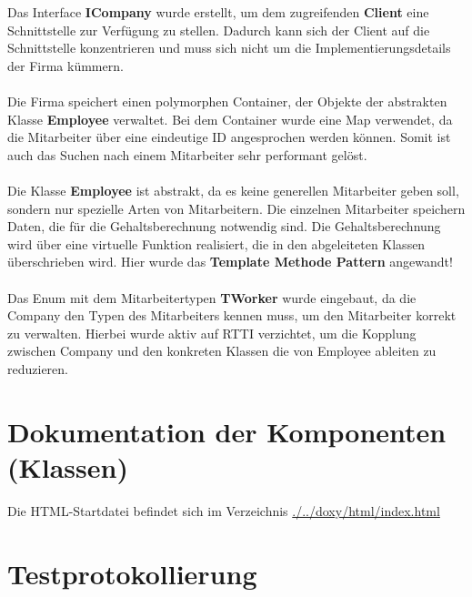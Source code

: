 \documentclass[12pt,naustrian,a4widepaper]{scrartcl}
\begin{document}
Das Interface \textbf{ICompany} wurde erstellt, um dem zugreifenden \textbf{Client} eine Schnittstelle zur Verfügung zu stellen.
Dadurch kann sich der Client auf die Schnittstelle konzentrieren und muss sich nicht um die Implementierungsdetails der Firma kümmern.
\\
\\
Die Firma speichert einen polymorphen Container, der Objekte der abstrakten Klasse \textbf{Employee} verwaltet.
Bei dem Container wurde eine Map verwendet, da die Mitarbeiter über eine eindeutige ID angesprochen werden können.
Somit ist auch das Suchen nach einem Mitarbeiter sehr performant gelöst.
\\
\\
Die Klasse \textbf{Employee} ist abstrakt, da es keine generellen Mitarbeiter geben soll, sondern nur spezielle Arten von Mitarbeitern.
Die einzelnen Mitarbeiter speichern Daten, die für die Gehaltsberechnung notwendig sind. 
Die Gehaltsberechnung wird über eine virtuelle Funktion realisiert, die in den abgeleiteten Klassen überschrieben wird.
Hier wurde das \textbf{Template Methode Pattern} angewandt!
\\
\\
Das Enum mit dem Mitarbeitertypen \textbf{TWorker} wurde eingebaut, da die Company den Typen des Mitarbeiters kennen muss, um den Mitarbeiter korrekt zu verwalten.
Hierbei wurde aktiv auf RTTI verzichtet, um die Kopplung zwischen Company und den konkreten Klassen die von Employee ableiten zu reduzieren.

\color{black}

\section{Dokumentation der Komponenten (Klassen)}
Die HTML-Startdatei befindet sich im Verzeichnis \href{run:./../doxy/html/index.html}{./../doxy/html/index.html}


\clearpage
\section{Testprotokollierung}

\end{document}
